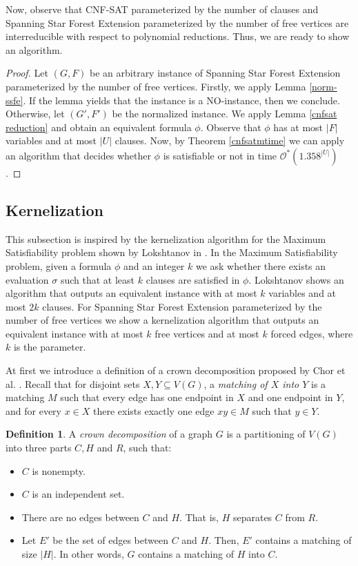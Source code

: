 \documentclass[en]{pracamgr}
\theoremstyle{definition}
\newtheorem{definition}{Definition}
\newcommand{\ssfep}{{\sc Spanning Star Forest Extension}}
\newcommand{\cnfsat}{{\sc CNF-SAT}}
\begin{document}
Now, observe that \cnfsat{} parameterized by the number of clauses and \ssfep{} parameterized by the number of free vertices are interreducible with respect to polynomial reductions. Thus, we are ready to show an algorithm.

\thmssfepfreealg*

\begin{proof}
	Let $(G,F)$ be an arbitrary instance of \ssfep{} parameterized by the number of free vertices. Firstly, we apply Lemma \ref{norm-ssfe}. If the lemma yields that the instance is a NO-instance, then we conclude. Otherwise, let $(G',F')$ be the normalized instance. We apply Lemma \ref{cnfsat reduction} and obtain an equivalent formula $\phi$. Observe that $\phi$ has at most $|F|$ variables and at most $|U|$ clauses. Now, by Theorem \ref{cnfsatmtime} we can apply an algorithm that decides whether $\phi$ is satisfiable or not in time $\mathcal{O}^*(1.358^{|U|})$.
\end{proof}

\subsection{Kernelization}

This subsection is inspired by the kernelization algorithm for the {\sc Maximum Satisfiability} problem shown by Lokshtanov in \cite{MAXSATKERNEL}. In the {\sc Maximum Satisfiability} problem, given a formula $\phi$ and an integer $k$ we ask whether there exists an evaluation $\sigma$ such that at least $k$ clauses are satisfied in $\phi$. Lokshtanov shows an algorithm that outputs an equivalent instance with at most $k$ variables and at most $2k$ clauses. For \ssfep{} parameterized by the number of free vertices we show a kernelization algorithm that outputs an equivalent instance with at most $k$ free vertices and at most $k$ forced edges, where $k$ is the parameter.

At first we introduce a definition of a crown decomposition proposed by Chor et al. \cite{Crown}. Recall that for disjoint sets $X,Y \subseteq V(G)$, a \textit{matching of $X$ into $Y$} is a matching $M$ such that every edge has one endpoint in $X$ and one endpoint in $Y$, and for every $x \in X$ there exists exactly one edge $xy \in M$ such that $y \in Y$.

\begin{definition}
	A \textit{crown decomposition} of a graph $G$ is a partitioning of $V(G)$ into three parts $C,H$ and $R$, such that:
	\begin{itemize}
		\item $C$ is nonempty.
		\item $C$ is an independent set.
		\item There are no edges between $C$ and $H$. That is, $H$ separates $C$ from $R$.
		\item Let $E'$ be the set of edges between $C$ and $H$. Then, $E'$ contains a matching of size $|H|$. In other words, $G$ contains a matching of $H$ into $C$.
	\end{itemize}
\end{definition}
\end{document}
